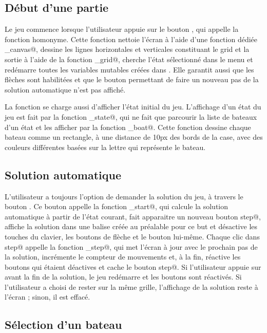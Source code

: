 \documentclass[a4paper,12pt]{article}
\begin{document}
\subsection{Début d'une partie}

Le jeu commence lorsque l'utilisateur appuie sur le bouton \verb@start@, qui appelle la fonction homonyme. Cette fonction nettoie l'écran à l'aide d'une fonction dédiée \verb@clear_canvas@, dessine les lignes horizontales et verticales constituant le grid et la sortie à l'aide de la fonction \verb@set_grid@, cherche l'état sélectionné dans le menu et redémarre toutes les variables mutables créées dans \verb@main@. Elle garantit aussi que les flèches sont habilitées et que le bouton permettant de faire un nouveau pas de la solution automatique n'est pas affiché.

La fonction \verb@start@ se charge aussi d'afficher l'état initial du jeu. L'affichage d'un état du jeu est fait par la fonction \verb@draw_state@, qui ne fait que parcourir la liste de bateaux d'un état et les afficher par la fonction \verb@draw_boat@. Cette fonction dessine chaque bateau comme un rectangle, à une distance de 10px des bords de la case, avec des couleurs différentes basées sur la lettre qui représente le bateau.

\subsection{Solution automatique}

L'utilisateur a toujours l'option de demander la solution du jeu, à travers le bouton \verb@solve@. Ce bouton appelle la fonction \verb@solve_start@, qui calcule la solution automatique à partir de l'état courant, fait apparaitre un nouveau bouton \verb@next step@, affiche la solution dans une balise \verb@div@ créée au préalable pour ce but et désactive les touches du clavier, les boutons de flèche et le bouton \verb@solve@ lui-même. Chaque clic dans \verb@next step@ appelle la fonction \verb@solve_step@, qui met l'écran à jour avec le prochain pas de la solution, incrémente le compteur de mouvements et, à la fin, réactive les boutons qui étaient déactives et cache le bouton \verb@next step@. Si l'utilisateur appuie sur \verb@start@ avant la fin de la solution, le jeu redémarre et les boutons sont réactivés. Si l'utilisateur a choisi de rester sur la même grille, l'affichage de la solution reste à l'écran ; sinon, il est effacé.

\subsection{Sélection d'un bateau}
\end{document}
